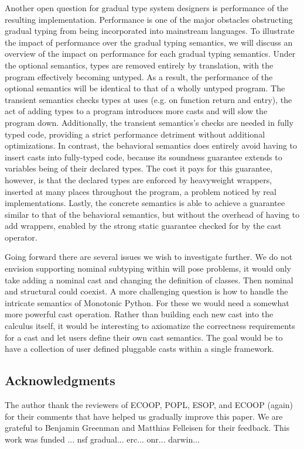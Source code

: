 \documentclass[USenglish]{tex/lipics-v2016}
\begin{document}
Another open question for gradual type system designers is performance of
the resulting implementation. Performance is one of the major obstacles
obstructing gradual typing from being incorporated into mainstream
languages. To illustrate the impact of performance over the gradual typing
semantics, we will discuss an overview of the impact on performance for each
gradual typing semantics.  Under the optional semantics, types are removed
entirely by translation, with the program effectively becoming untyped. As a
result, the performance of the optional semantics will be identical to that
of a wholly untyped program.  The transient semantics checks types at uses
(e.g. on function return and entry), the act of adding types to a program
introduces more casts and will slow the program down. Additionally, the
transient semantics's checks are needed in fully typed code, providing a
strict performance detriment without additional optimizations.  In contrast,
the behavioral semantics does entirely avoid having to insert casts into
fully-typed code, because its soundness guarantee extends to variables being
of their declared types. The cost it pays for this guarantee, however, is
that the declared types are enforced by heavyweight wrappers, inserted at
many places throughout the program, a problem noticed by real
implementations.  Lastly, the concrete semantics is able to achieve a
guarantee similar to that of the behavioral semantics, but without the
overhead of having to add wrappers, enabled by the strong static guarantee
checked for by the cast operator.

Going forward there are several issues we wish to investigate further.  We
do not envision supporting nominal subtyping within \kafka will pose
problems, it would only take adding a nominal cast and changing the
definition of classes. Then nominal and structural could coexist. A more
challenging question is how to handle the intricate semantics of Monotonic
Python. For these we would need a somewhat more powerful cast operation.
Rather than building each new cast into the calculus itself, it would be
interesting to axiomatize the correctness requirements for a cast and let
users define their own cast semantics. The goal would be to have a collection
of user defined pluggable casts within a single framework.

\subsection*{Acknowledgments} The author thank the reviewers of ECOOP, POPL,
ESOP, and ECOOP (again) for their comments that have helped us gradually
improve this paper. We are grateful to Benjamin Greenman and Matthias
Felleisen for their feedback.  This work was funded ... nsf
gradual... erc...  onr... darwin...



\end{document}
